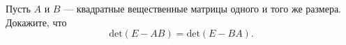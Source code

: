 \documentclass{article}
\begin{document}
Пусть $A$ и $B$ --- квадратные вещественные матрицы одного и того же размера. Докажите, что
$$\mathrm{det} (E-AB) = \mathrm{det} (E-BA).$$
\end{document}
